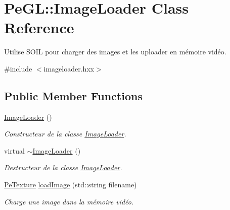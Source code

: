 \hypertarget{classPeGL_1_1ImageLoader}{\section{Pe\-G\-L\-:\-:Image\-Loader Class Reference}
\label{classPeGL_1_1ImageLoader}
}


Utilise S\-O\-I\-L pour charger des images et les uploader en mémoire vidéo.  




{\ttfamily \#include $<$imageloader.\-hxx$>$}

\subsection*{Public Member Functions}
\begin{DoxyCompactItemize}
\item 
\hypertarget{classPeGL_1_1ImageLoader_a57358d754ff70ad64036dfd98ae72aab}{\hyperlink{classPeGL_1_1ImageLoader_a57358d754ff70ad64036dfd98ae72aab}{Image\-Loader} ()}\label{classPeGL_1_1ImageLoader_a57358d754ff70ad64036dfd98ae72aab}

\begin{DoxyCompactList}\small\item\em Constructeur de la classe \hyperlink{classPeGL_1_1ImageLoader}{Image\-Loader}. \end{DoxyCompactList}\item 
\hypertarget{classPeGL_1_1ImageLoader_a1a9cdaf8fb35d6abc8c11deb3ee9c54f}{virtual \hyperlink{classPeGL_1_1ImageLoader_a1a9cdaf8fb35d6abc8c11deb3ee9c54f}{$\sim$\-Image\-Loader} ()}\label{classPeGL_1_1ImageLoader_a1a9cdaf8fb35d6abc8c11deb3ee9c54f}

\begin{DoxyCompactList}\small\item\em Destructeur de la classe \hyperlink{classPeGL_1_1ImageLoader}{Image\-Loader}. \end{DoxyCompactList}\item 
\hyperlink{structPeGL_1_1PeTexture}{Pe\-Texture} \hyperlink{classPeGL_1_1ImageLoader_aeb528e3bc635d7817fc477326e0d1e4a}{load\-Image} (std\-::string filename)
\begin{DoxyCompactList}\small\item\em Charge une image dans la mémoire vidéo. \end{DoxyCompactList}\end{DoxyCompactItemize}


